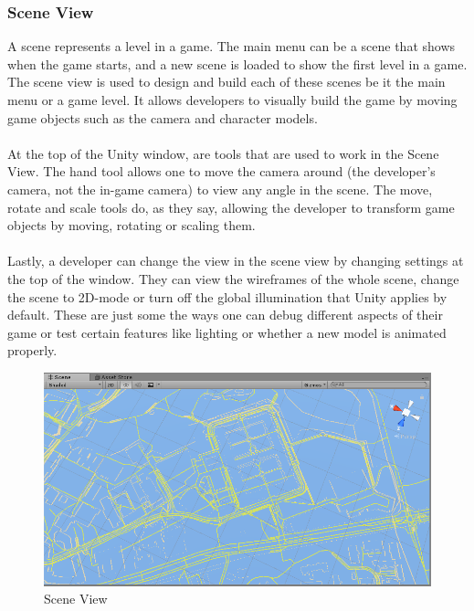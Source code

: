 \documentclass[a4paper]{report}
\begin{document}
\subsubsection{Scene View}
A scene represents a level in a game. The main menu can be a scene that shows when the game starts, and a new scene is loaded to show the first level in a game. The scene view is used to design and build each of these scenes be it the main menu or a game level. It allows developers to visually build the game by moving game objects such as the camera and character models. 
\\\\
At the top of the Unity window, are tools that are used to work in the Scene View. The hand tool allows one to move the camera around (the developer's camera, not the in-game camera) to view any angle in the scene. The move, rotate and scale tools do, as they say, allowing the developer to transform game objects by moving, rotating or scaling them.
\\\\
Lastly, a developer can change the view in the scene view by changing settings at the top of the window. They can view the wireframes of the whole scene, change the scene to 2D-mode or turn off the global illumination that Unity applies by default. These are just some the ways one can debug different aspects of their game or test certain features like lighting or whether a new model is animated properly. \cite{Unity}

\begin{figure}[h]
\centering
\includegraphics[scale=0.7]{"scene view"}
\caption{Scene View}
\end{figure}
\end{document}
